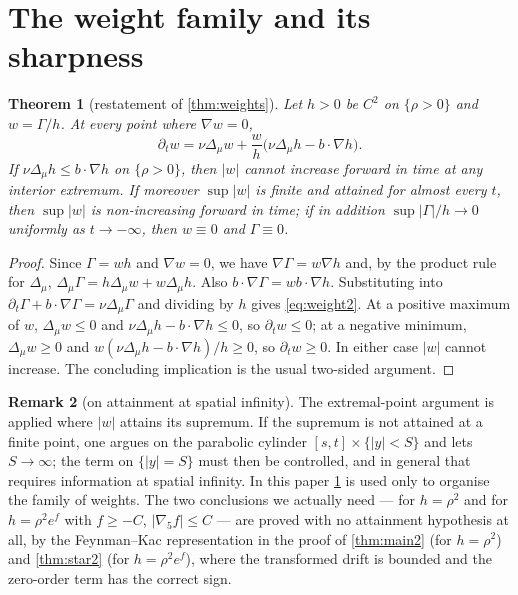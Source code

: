 \documentclass[11pt]{article}
\newtheorem{theorem}{Theorem}[section]
\theoremstyle{definition}
\newtheorem{remark}[theorem]{Remark}
\begin{document}
\section{The weight family and its sharpness}

\begin{theorem}[restatement of \cref{thm:weights}]\label{thm:weights2}
Let $h>0$ be $C^2$ on $\{\rho>0\}$ and $w=\Gamma/h$. At every point where
$\nabla w=0$,
\begin{equation}\label{eq:weight2}
\partial_t w=\nu\Delta_\mu w+\frac{w}{h}\bigl(\nu\Delta_\mu h-b\cdot\nabla h\bigr).
\end{equation}
If $\nu\Delta_\mu h\le b\cdot\nabla h$ on $\{\rho>0\}$, then $|w|$ cannot
increase forward in time at any interior extremum. If moreover $\sup|w|$ is
finite and attained for almost every $t$, then $\sup|w|$ is non-increasing
forward in time; if in addition $\sup|\Gamma|/h\to0$ uniformly as
$t\to-\infty$, then $w\equiv0$ and $\Gamma\equiv0$.
\end{theorem}
\begin{proof}
Since $\Gamma=wh$ and $\nabla w=0$, we have $\nabla\Gamma=w\nabla h$ and,
by the product rule for $\Delta_\mu$,
$\Delta_\mu\Gamma=h\Delta_\mu w+w\Delta_\mu h$. Also
$b\cdot\nabla\Gamma=wb\cdot\nabla h$. Substituting into
$\partial_t\Gamma+b\cdot\nabla\Gamma=\nu\Delta_\mu\Gamma$ and dividing by
$h$ gives \eqref{eq:weight2}. At a positive maximum of $w$, $\Delta_\mu w\le0$
and $\nu\Delta_\mu h-b\cdot\nabla h\le0$, so $\partial_tw\le0$; at a negative
minimum, $\Delta_\mu w\ge0$ and $w(\nu\Delta_\mu h-b\cdot\nabla h)/h\ge0$, so
$\partial_tw\ge0$. In either case $|w|$ cannot increase. The concluding
implication is the usual two-sided argument.
\end{proof}

\begin{remark}[on attainment at spatial infinity]\label{rem:attain}
The extremal-point argument is applied where $|w|$ attains its supremum. If the
supremum is not attained at a finite point, one argues on the parabolic cylinder
$[s,t]\times\{|y|<S\}$ and lets $S\to\infty$; the term on $\{|y|=S\}$ must then be
controlled, and in general that requires information at spatial infinity. In this
paper \cref{thm:weights2} is used only to organise the family of weights. The two
conclusions we actually need --- for $h=\rho^2$ and for
$h=\rho^2e^{f}$ with $f\ge-C$, $|\nabla_5f|\le C$ --- are proved with no
attainment hypothesis at all, by the Feynman--Kac representation in the proof of
\cref{thm:main2} (for $h=\rho^2$) and \cref{thm:star2} (for
$h=\rho^2e^f$), where the transformed drift is bounded and the zero-order term
has the correct sign.
\end{remark}
\end{document}
